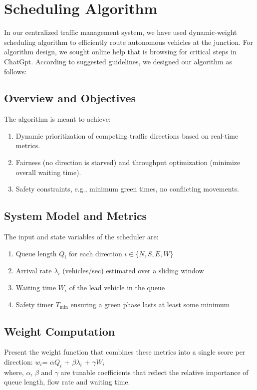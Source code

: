 \section{Scheduling Algorithm}
In our centralized traffic management system, we have used dynamic-weight scheduling algorithm to efficiently route autonomous vehicles at the junction. For algorithm design, we sought online help that is browsing for critical steps in ChatGpt. According to suggested guidelines, we designed our algorithm as follows:
\subsection{Overview and Objectives}
The algorithm is meant to achieve:
\begin{enumerate}[label=(\alph*)]
    \item Dynamic prioritization of competing traffic directions based on real-time metrics.
    \item Fairness (no direction is starved) and throughput optimization (minimize overall waiting time).
    \item Safety constraints, e.g., minimum green times, no conflicting movements.
\end{enumerate}
\subsection{System Model and Metrics}
The input and state variables of the scheduler are:
\begin{enumerate}[label=(\alph*)]
    \item Queue length $Q_i$ for each direction $i \in \{N, S, E, W\}$
    \item Arrival rate $\lambda_i$
 (vehicles/sec) estimated over a sliding window
    \item Waiting time $W_i$ of the lead vehicle in the queue
    \item Safety timer $T_{\text{min}}$ ensuring a green phase lasts at least some minimum
\end{enumerate}
\subsection{Weight Computation}
Present the weight function that combines these metrics into a single score per direction:
$w_i$= $\alpha$$Q_i$ +  $\beta$$\lambda_i$ + $\gamma$$W_i$\\
where, $\alpha$, $\beta$ and $\gamma$ are tunable coefficients that reflect the relative importance of queue length, flow rate and waiting time.
